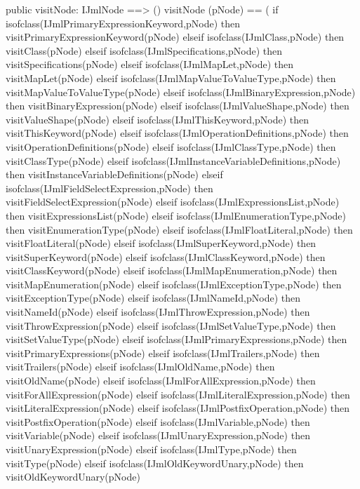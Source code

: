 \begin{vdm_al}
  public visitNode: IJmlNode ==> ()
  visitNode (pNode) ==
    ( if isofclass(IJmlPrimaryExpressionKeyword,pNode) then visitPrimaryExpressionKeyword(pNode)
      elseif isofclass(IJmlClass,pNode) then visitClass(pNode)
      elseif isofclass(IJmlSpecifications,pNode) then visitSpecifications(pNode)
      elseif isofclass(IJmlMapLet,pNode) then visitMapLet(pNode)
      elseif isofclass(IJmlMapValueToValueType,pNode) then visitMapValueToValueType(pNode)
      elseif isofclass(IJmlBinaryExpression,pNode) then visitBinaryExpression(pNode)
      elseif isofclass(IJmlValueShape,pNode) then visitValueShape(pNode)
      elseif isofclass(IJmlThisKeyword,pNode) then visitThisKeyword(pNode)
      elseif isofclass(IJmlOperationDefinitions,pNode) then visitOperationDefinitions(pNode)
      elseif isofclass(IJmlClassType,pNode) then visitClassType(pNode)
      elseif isofclass(IJmlInstanceVariableDefinitions,pNode) then visitInstanceVariableDefinitions(pNode)
      elseif isofclass(IJmlFieldSelectExpression,pNode) then visitFieldSelectExpression(pNode)
      elseif isofclass(IJmlExpressionsList,pNode) then visitExpressionsList(pNode)
      elseif isofclass(IJmlEnumerationType,pNode) then visitEnumerationType(pNode)
      elseif isofclass(IJmlFloatLiteral,pNode) then visitFloatLiteral(pNode)
      elseif isofclass(IJmlSuperKeyword,pNode) then visitSuperKeyword(pNode)
      elseif isofclass(IJmlClassKeyword,pNode) then visitClassKeyword(pNode)
      elseif isofclass(IJmlMapEnumeration,pNode) then visitMapEnumeration(pNode)
      elseif isofclass(IJmlExceptionType,pNode) then visitExceptionType(pNode)
      elseif isofclass(IJmlNameId,pNode) then visitNameId(pNode)
      elseif isofclass(IJmlThrowExpression,pNode) then visitThrowExpression(pNode)
      elseif isofclass(IJmlSetValueType,pNode) then visitSetValueType(pNode)
      elseif isofclass(IJmlPrimaryExpressions,pNode) then visitPrimaryExpressions(pNode)
      elseif isofclass(IJmlTrailers,pNode) then visitTrailers(pNode)
      elseif isofclass(IJmlOldName,pNode) then visitOldName(pNode)
      elseif isofclass(IJmlForAllExpression,pNode) then visitForAllExpression(pNode)
      elseif isofclass(IJmlLiteralExpression,pNode) then visitLiteralExpression(pNode)
      elseif isofclass(IJmlPostfixOperation,pNode) then visitPostfixOperation(pNode)
      elseif isofclass(IJmlVariable,pNode) then visitVariable(pNode)
      elseif isofclass(IJmlUnaryExpression,pNode) then visitUnaryExpression(pNode)
      elseif isofclass(IJmlType,pNode) then visitType(pNode)
      elseif isofclass(IJmlOldKeywordUnary,pNode) then visitOldKeywordUnary(pNode)

\end{vdm_al}
